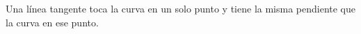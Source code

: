 \documentclass[preview]{standalone}
\begin{document}
\begin{center}
Una línea tangente toca la curva en un solo punto y tiene la misma pendiente que la curva en ese punto.
\end{center}
\end{document}
